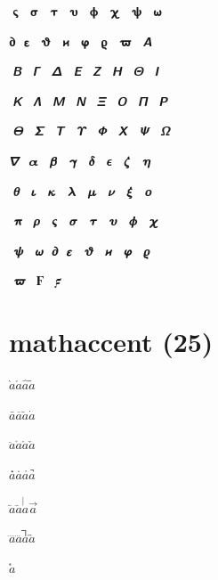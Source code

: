 \documentclass{article}
\begin{document}
$\mbfsansvarsigma$ $\mbfsanssigma$ $\mbfsanstau$ $\mbfsansupsilon$ $\mbfsansvarphi$ $\mbfsanschi$ $\mbfsanspsi$ $\mbfsansomega$ \par
$\mbfsanspartial$ $\mbfsansepsilon$ $\mbfsansvartheta$ $\mbfsansvarkappa$ $\mbfsansphi$ $\mbfsansvarrho$ $\mbfsansvarpi$ $\mbfitsansAlpha$ \par
$\mbfitsansBeta$ $\mbfitsansGamma$ $\mbfitsansDelta$ $\mbfitsansEpsilon$ $\mbfitsansZeta$ $\mbfitsansEta$ $\mbfitsansTheta$ $\mbfitsansIota$ \par
$\mbfitsansKappa$ $\mbfitsansLambda$ $\mbfitsansMu$ $\mbfitsansNu$ $\mbfitsansXi$ $\mbfitsansOmicron$ $\mbfitsansPi$ $\mbfitsansRho$ \par
$\mbfitsansvarTheta$ $\mbfitsansSigma$ $\mbfitsansTau$ $\mbfitsansUpsilon$ $\mbfitsansPhi$ $\mbfitsansChi$ $\mbfitsansPsi$ $\mbfitsansOmega$ \par
$\mbfitsansnabla$ $\mbfitsansalpha$ $\mbfitsansbeta$ $\mbfitsansgamma$ $\mbfitsansdelta$ $\mbfitsansvarepsilon$ $\mbfitsanszeta$ $\mbfitsanseta$ \par
$\mbfitsanstheta$ $\mbfitsansiota$ $\mbfitsanskappa$ $\mbfitsanslambda$ $\mbfitsansmu$ $\mbfitsansnu$ $\mbfitsansxi$ $\mbfitsansomicron$ \par
$\mbfitsanspi$ $\mbfitsansrho$ $\mbfitsansvarsigma$ $\mbfitsanssigma$ $\mbfitsanstau$ $\mbfitsansupsilon$ $\mbfitsansvarphi$ $\mbfitsanschi$ \par
$\mbfitsanspsi$ $\mbfitsansomega$ $\mbfitsanspartial$ $\mbfitsansepsilon$ $\mbfitsansvartheta$ $\mbfitsansvarkappa$ $\mbfitsansphi$ $\mbfitsansvarrho$ \par
$\mbfitsansvarpi$ $\mbfDigamma$ $\mbfdigamma$\par

\section*{mathaccent (25)}

$\grave{a}$\quad{}$\acute{a}$\quad{}$\hat{a}$\quad{}$\tilde{a}$\quad{}\par
$\bar{a}$\quad{}$\overbar{a}$\quad{}$\breve{a}$\quad{}$\dot{a}$\quad{}\par
$\ddot{a}$\quad{}$\ovhook{a}$\quad{}$\ocirc{a}$\quad{}$\check{a}$\quad{}\par
$\candra{a}$\quad{}$\oturnedcomma{a}$\quad{}$\ocommatopright{a}$\quad{}$\droang{a}$\quad{}\par
$\leftharpoonaccent{a}$\quad{}$\rightharpoonaccent{a}$\quad{}$\vertoverlay{a}$\quad{}$\vec{a}$\quad{}\par
$\dddot{a}$\quad{}$\ddddot{a}$\quad{}$\annuity{a}$\quad{}$\widebridgeabove{a}$\quad{}\par
$\asteraccent{a}$\par
\end{document}
